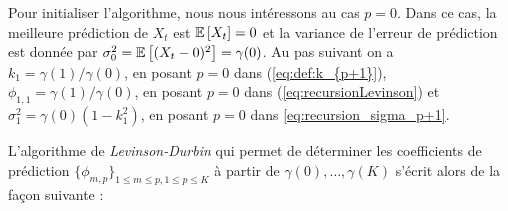 
Pour initialiser l'algorithme, nous nous int\'eressons au cas $p=0$.
Dans ce cas, la meilleure pr\'ediction de $X_t$ est ${\mathbb E}\left[ X_t \right]=0$ et la variance de
l'erreur de pr\'ediction est donn\'ee par $\sigma_{0}^2
={\mathbb E}\left[ (X_t-0)^2 \right]=\gamma(0)$. Au pas suivant on a
$k_1=\gamma(1)/\gamma(0)$, en posant $p=0$ dans (\ref{eq:def:k_{p+1}}),
$\phi_{1,1}=\gamma(1)/\gamma(0)$, en posant $p=0$ dans (\ref{eq:recursionLevinson}) et
$\sigma_1^2=\gamma(0)(1-k_1^2)$, en posant  $p=0$ dans \eqref{eq:recursion_sigma_p+1}.

L'algorithme de \emph{Levinson-Durbin} qui permet de d\'eterminer les coefficients de pr\'ediction
$\{\phi_{m,p}\}_{1\leq m\leq p,1\leq p\leq K}$ \`a partir de
$\gamma(0),\dots,\gamma(K)$ s'\'ecrit alors de la fa\c{c}on suivante :



